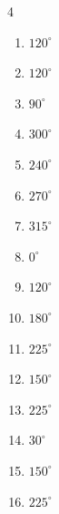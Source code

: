 \begin{multicols}{4}
\begin{enumerate}
  \item $\displaystyle 120^{\circ}$

  \item $\displaystyle 120^{\circ}$

  \item $\displaystyle 90^{\circ}$

  \item $\displaystyle 300^{\circ}$

  \item $\displaystyle 240^{\circ}$

  \item $\displaystyle 270^{\circ}$

  \item $\displaystyle 315^{\circ}$

  \item $\displaystyle 0^{\circ}$
        \phantom{$\displaystyle =0$}

  \item $\displaystyle 120^{\circ}$

  \item $\displaystyle 180^{\circ}$
        \phantom{$\displaystyle =\pi$}

  \item $\displaystyle 225^{\circ}$

  \item $\displaystyle 150^{\circ}$

  \item $\displaystyle 225^{\circ}$

\columnbreak %

  \item $\displaystyle 30^{\circ}$

  \item $\displaystyle 150^{\circ}$

  \item $\displaystyle 225^{\circ}$


\end{enumerate}
\end{multicols}

